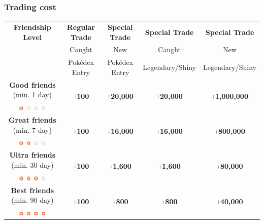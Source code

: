 \documentclass[8pt,aspectratio=43,compress]{beamer}
\renewcommand{\baselinestretch}{1.1}
\newcommand{\stardust}{\includegraphics[height=0.2cm]{../../images/objects/stardust}}
\newcommand{\heartfull}{\includegraphics[width=0.2cm]{heartfull}}
\newcommand{\heartempty}{\includegraphics[width=0.2cm]{heartempty}}
\begin{document}
\renewcommand{\baselinestretch}{1.1}
\begin{frame}
\frametitle{Trading cost}

\begin{block}{}

\begin{footnotesize}
\begin{center}
\begin{tabular}{ccccc}
\textbf{Friendship Level} &  \textbf{Regular Trade} & \textbf{Special Trade} & \textbf{Special Trade} & \textbf{Special Trade} \\
& Caught & New & Caught & New \\
& Pokédex Entry &  Pokédex Entry & Legendary/Shiny & Legendary/Shiny \\
\hline
\textbf{Good friends} (min. 1 day) & \multirow{2}{*}{\stardust \textbf{100}} & \multirow{2}{*}{\stardust \textbf{20,000}} &  \multirow{2}{*}{\stardust \textbf{20,000}} & \multirow{2}{*}{\stardust \textbf{1,000,000}} \\ 
\heartfull~\heartempty~\heartempty~\heartempty&&&  \\ \hline
\textbf{Great friends} (min. 7 day) &  \multirow{2}{*}{\stardust \textbf{100}} & \multirow{2}{*}{\stardust \textbf{16,000}} &  \multirow{2}{*}{\stardust \textbf{16,000}} & \multirow{2}{*}{\stardust \textbf{800,000}} \\ 
\heartfull~\heartfull~\heartempty~\heartempty &&&  \\ \hline
\textbf{Ultra friends} (min. 30 day) &  \multirow{2}{*}{\stardust \textbf{100}} & \multirow{2}{*}{\stardust \textbf{1,600}} &  \multirow{2}{*}{\stardust \textbf{1,600}} & \multirow{2}{*}{\stardust \textbf{80,000}}  \\ 
\heartfull~\heartfull~\heartfull~\heartempty &&&  \\ \hline
\textbf{Best friends} (min. 90 day) &  \multirow{2}{*}{\stardust \textbf{100}} & \multirow{2}{*}{\stardust \textbf{800}} &  \multirow{2}{*}{\stardust \textbf{800}} & \multirow{2}{*}{\stardust \textbf{40,000}} \\ 
\heartfull~\heartfull~\heartfull~\heartfull &&&  \\ \hline
\end{tabular}
\end{center}
\end{footnotesize}
\end{block}
\end{frame}
\end{document}
